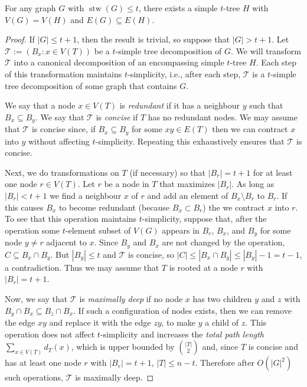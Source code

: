 \documentclass[kpfonts]{patmorin}
\DeclareMathOperator{\stw}{stw}
\theoremstyle{named}
\begin{document}
\begin{lem}\label{simple-subgraph}
    For any graph $G$ with $\stw(G)\le t$, there exists a simple $t$-tree $H$ with $V(G)= V(H)$ and $E(G)\subseteq E(H)$.
\end{lem}

\begin{proof}
    If $|G|\le t+1$, then the result is trivial, so suppose that $|G|>t+1$.
    Let $\mathcal{T}:=(B_x:x\in V(T))$ be a $t$-simple tree decomposition of $G$.  We will transform $\mathcal{T}$ into a canonical decomposition of an encompassing simple $t$-tree $H$.  Each step of this transformation maintains $t$-simplicity, i.e., after each step, $\mathcal{T}$ is a $t$-simple tree decomposition of some graph that contains $G$.

    We say that a node $x\in V(T)$ is \emph{redundant} if it has a neighbour $y$ such that $B_x\subseteq B_y$.  We say that $\mathcal{T}$ is \emph{concise} if $T$ has no redundant nodes.  We may assume that $\mathcal{T}$ is concise since,  if $B_x\subseteq B_y$ for some $xy\in E(T)$ then we can contract $x$ into $y$ without affecting $t$-simplicity.  Repeating this exhaustively ensures that $\mathcal{T}$ is concise.

    Next, we do transformations on $T$ (if necessary) so that $|B_r|=t+1$ for at least one node $r\in V(T)$. Let $r$ be a node in $T$ that maximizes $|B_r|$. As long as $|B_r|<t+1$ we find a neighbour $x$ of $r$ and add an element of $B_x\setminus B_r$ to $B_r$.  If this causes $B_x$ to become redundant (because $B_x\subset B_r$) the we contract $x$ into $r$.  To see that this operation maintains $t$-simplicity, suppose that, after the operation some $t$-element subset of $V(G)$ appears in $B_r$, $B_x$, and $B_y$ for some node $y\neq r$ adjacent to $x$.  Since $B_y$ and $B_x$ are not changed by the operation, $C\subseteq B_x\cap B_y$.  But $|B_y|\le t$ and $\mathcal{T}$ is concise, so $|C|\le|B_x\cap B_y|\le|B_y|-1= t-1$, a contradiction. Thus we may assume that $T$ is rooted at a node $r$ with $|B_r|=t+1$.

    Now, we say that $\mathcal{T}$ is \emph{maximally deep} if no node $x$ has two children $y$ and $z$ with $B_y\cap B_x\subseteq B_z\cap B_x$.  If such a configuration of nodes exists, then we can remove the edge $xy$ and replace it with the edge $zy$, to make $y$ a child of $z$.  This operation does not affect $t$-simplicity and increases the \emph{total path length} $\sum_{x\in V(T)} d_T(x)$, which is upper bounded by $\binom{|T|}{2}$ and, since $T$ is concise and has at least one node $r$ with $|B_r|=t+1$, $|T|\le n-t$.  Therefore after $O(|G|^2)$ such operations, $\mathcal{T}$ is maximally deep.


\end{proof}
\end{document}
